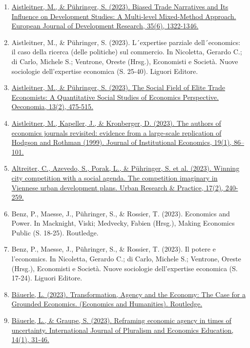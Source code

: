 \begin{enumerate}
	 \item \href{https://doi.org/10.1057/s41287-023-00583-z}{Aistleitner, M., \& Pühringer, S. (2023). Biased Trade Narratives and Its Influence on Development Studies: A Multi-level Mixed-Method Approach. European Journal of Development Research, 35(6), 1322-1346.}
	 \item Aistleitner, M., \& Pühringer, S. (2023). L´expertise parziale dell´economics: il caso della ricerca (delle politiche) sul commercio. In Nicoletta, Gerardo C.; di Carlo, Michele S.; Ventrone, Oreste (Hrsg.), Economisti e Società. Nuove sociologie dell'expertise economica (S. 25-40). Liguori Editore.
	 \item \href{https://doi.org/10.4000/oeconomia.15808}{Aistleitner, M., \& Pühringer, S. (2023). The Social Field of Elite Trade Economists: A Quantitative Social Studies of Economics Perspective. Oeconomia, 13(2), 475-515.}
	 \item \href{https://doi.org/10.1017/S174413742200025X}{Aistleitner, M., Kapeller, J., \& Kronberger, D. (2023). The authors of economics journals revisited: evidence from a large-scale replication of Hodgson and Rothman (1999). Journal of Institutional Economics, 19(1), 86–101.}
	 \item \href{https://doi.org/10.1080/17535069.2022.2161834}{Altreiter, C., Azevedo, S., Porak, L., \& Pühringer, S. et al. (2023). Winning city competition with a social agenda. The competition imaginary in Viennese urban development plans. Urban Research \& Practice, 17(2), 240-259.}
	 \item Benz, P., Maesse, J., Pühringer, S., \& Rossier, T. (2023). Economics and Power. In Macknight, Viski; Medvecky, Fabien (Hrsg.), Making Economics Public (S. 18-25). Routledge.
	 \item Benz, P., Maesse, J., Pühringer, S., \& Rossier, T. (2023). Il potere e l'economics. In Nicoletta, Gerardo C.; di Carlo, Michele S.; Ventrone, Oreste (Hrsg.), Economisti e Società. Nuove sociologie dell'expertise economica (S. 17-24). Liguori Editore.
	 \item \href{https://doi.org/10.4324/9781003371687}{Bäuerle, L. (2023). Transformation, Agency and the Economy: The Case for a Grounded Economics. (Economics and Humanities). Routledge.}
	 \item \href{https://doi.org/10.1504/IJPEE.2023.133642}{Bäuerle, L., \& Graupe, S. (2023). Reframing economic agency in times of uncertainty. International Journal of Pluralism and Economics Education, 14(1), 31-46.}

\end{enumerate}
